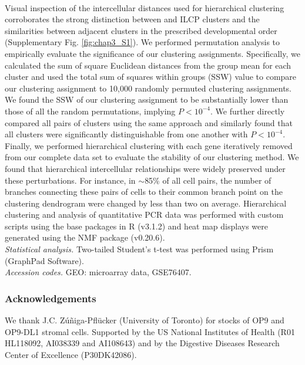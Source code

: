 \\
Visual inspection of the intercellular distances used for hierarchical clustering corroborates the strong distinction between \aLP and ILCP clusters and the similarities between adjacent clusters in the prescribed developmental order (Supplementary Fig. \ref{fig:chap3_S1}). We performed permutation analysis to empirically evaluate the significance of our clustering assignments. Specifically, we calculated the sum of square Euclidean distances from the group mean for each cluster and used the total sum of squares within groups (SSW) value to compare our clustering assignment to 10,000 randomly permuted clustering assignments. We found the SSW of our clustering assignment to be substantially lower than those of all the random permutations, implying $P < 10^{−4}$. We further directly compared all pairs of clusters using the same approach and similarly found that all clusters were significantly distinguishable from one another with $P < 10^{−4}
$. Finally, we performed hierarchical clustering with each gene iteratively removed from our complete data set to evaluate the stability of our clustering method. We found that hierarchical intercellular relationships were widely preserved under these perturbations. For instance, in $\sim$85\% of all cell pairs, the number of branches connecting these pairs of cells to their common branch point on the clustering dendrogram were changed by less than two on average. Hierarchical clustering and analysis of quantitative PCR data was performed with custom scripts using the base packages in R (v3.1.2) and heat map displays were generated using the NMF package (v0.20.6).
\\
\textit{Statistical analysis.}
Two-tailed Student's t-test was performed using Prism (GraphPad Software).
\\
\textit{Accession codes.}
GEO: microarray data, GSE76407.

\subsubsection{Acknowledgements}

We thank J.C. Zúñiga-Pflücker (University of Toronto) for stocks of OP9 and OP9-DL1 stromal cells. Supported by the US National Institutes of Health (R01 HL118092, AI038339 and AI108643) and by the Digestive Diseases Research Center of Excellence (P30DK42086).

\renewcommand\thefigure{\thechapter.S\arabic{figure}} 

